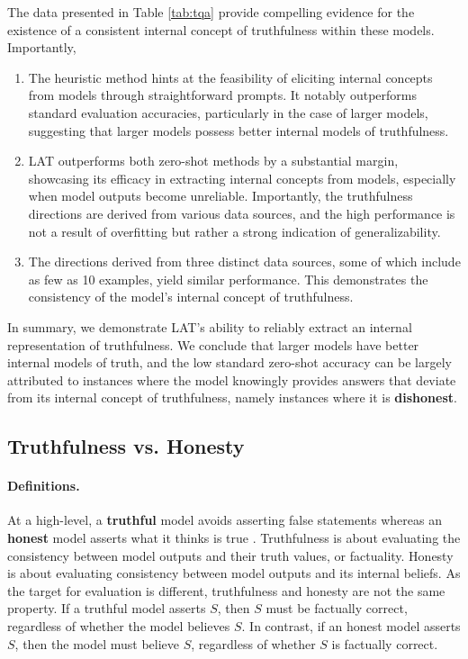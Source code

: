 The data presented in Table \ref{tab:tqa} provide compelling evidence for the existence of a consistent internal concept of truthfulness within these models. Importantly,
\begin{enumerate}[leftmargin=*]
    \item The heuristic method hints at the feasibility of eliciting internal concepts from models through straightforward prompts. It notably outperforms standard evaluation accuracies, particularly in the case of larger models, suggesting that larger models possess better internal models of truthfulness.
    \item LAT outperforms both zero-shot methods by a substantial margin, showcasing its efficacy in extracting internal concepts from models, especially when model outputs become unreliable. Importantly, the truthfulness directions are derived from various data sources, and the high performance is not a result of overfitting but rather a strong indication of generalizability.
    \item The directions derived from three distinct data sources, some of which include as few as 10 examples, yield similar performance. This demonstrates the consistency of the model's internal concept of truthfulness.
\end{enumerate}
In summary, we demonstrate LAT's ability to reliably extract an internal representation of truthfulness. We conclude that larger models have better internal models of truth, and the low standard zero-shot accuracy can be largely attributed to instances where the model knowingly provides answers that deviate from its internal concept of truthfulness, namely instances where it is \textbf{dishonest}.










\subsection{Truthfulness vs. Honesty}

\paragraph{Definitions.}
At a high-level, a \textbf{truthful} model avoids asserting false statements whereas an \textbf{honest} model asserts what it thinks is true \citep{evans2021truthful}. Truthfulness is about evaluating  the consistency between model outputs and their truth values, or factuality. Honesty is about evaluating consistency between model outputs and its internal beliefs. As the target for evaluation is different, truthfulness and honesty are not the same property. If a truthful model asserts $S$, then $S$ must be factually correct, regardless of whether the model believes $S$. In contrast, if an honest model asserts $S$, then the model must believe $S$, regardless of whether $S$ is factually correct.



